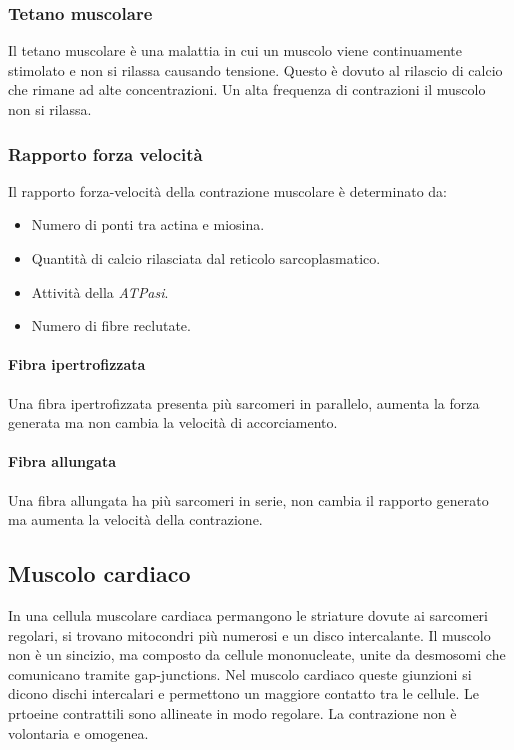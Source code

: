 		\subsubsection{Tetano muscolare}
		Il tetano muscolare \`e una malattia in cui un muscolo viene continuamente stimolato e non si rilassa causando tensione.
		Questo \`e dovuto al rilascio di calcio che rimane ad alte concentrazioni.
		Un alta frequenza di contrazioni il muscolo non si rilassa.

		\subsubsection{Rapporto forza velocit\`a}
		Il rapporto forza-velocit\`a della contrazione muscolare \`e determinato da:
		\begin{multicols}{2}
			\begin{itemize}
				\item Numero di ponti tra actina e miosina.
				\item Quantit\`a di calcio rilasciata dal reticolo sarcoplasmatico.
				\item Attivit\`a della \emph{ATPasi}.
				\item Numero di fibre reclutate.
			\end{itemize}
		\end{multicols}

			\paragraph{Fibra ipertrofizzata}
			Una fibra ipertrofizzata presenta pi\`u sarcomeri in parallelo, aumenta la forza generata ma non cambia la velocit\`a di accorciamento.

			\paragraph{Fibra allungata}
			Una fibra allungata ha pi\`u sarcomeri in serie, non cambia il rapporto generato ma aumenta la velocit\`a della contrazione.


	\subsection{Muscolo cardiaco}
	In una cellula muscolare cardiaca permangono le striature dovute ai sarcomeri regolari, si trovano mitocondri pi\`u numerosi e un disco intercalante.
	Il muscolo non \`e un sincizio, ma composto da cellule mononucleate, unite da desmosomi che comunicano tramite gap-junctions.
	Nel muscolo cardiaco queste giunzioni si dicono dischi intercalari e permettono un maggiore contatto tra le cellule.
	Le prtoeine contrattili sono allineate in modo regolare.
	La contrazione non \`e volontaria e omogenea.


